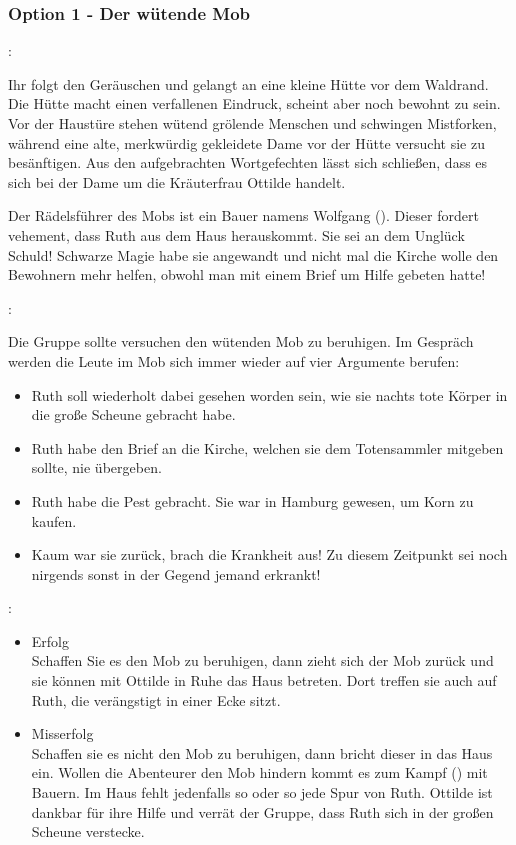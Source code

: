 \subsubsection{Option 1 - Der wütende Mob}
\label{mob}

:

Ihr folgt den Geräuschen und gelangt an eine kleine Hütte vor dem Waldrand. Die Hütte macht einen verfallenen Eindruck, scheint aber noch bewohnt zu sein. Vor der Haustüre stehen wütend grölende Menschen und schwingen Mistforken, während eine alte, merkwürdig gekleidete Dame vor der Hütte versucht sie zu besänftigen.
Aus den aufgebrachten Wortgefechten lässt sich schließen, dass es sich bei der Dame um die Kräuterfrau Ottilde handelt.

Der Rädelsführer des Mobs ist ein Bauer namens Wolfgang (\blue{\ref{Wolfgang}}). Dieser fordert vehement, dass Ruth aus dem Haus herauskommt. Sie sei an dem Unglück Schuld! Schwarze Magie habe sie angewandt und nicht mal die Kirche wolle den Bewohnern mehr helfen, obwohl man mit einem Brief um Hilfe gebeten hatte!

:

Die Gruppe sollte versuchen den wütenden Mob zu beruhigen. Im Gespräch werden die Leute im Mob sich immer wieder auf vier Argumente berufen:

\begin{itemize}
  \item Ruth soll wiederholt dabei gesehen worden sein, wie sie nachts tote Körper in die große Scheune gebracht habe.
  \item Ruth habe den Brief an die Kirche, welchen sie dem Totensammler mitgeben sollte, nie übergeben.
  \item Ruth habe die Pest gebracht. Sie war in Hamburg gewesen, um Korn zu kaufen.
  \item Kaum war sie zurück, brach die Krankheit aus! Zu diesem Zeitpunkt sei noch nirgends sonst in der Gegend jemand erkrankt!
\end{itemize}

:

\begin{itemize}
  \item Erfolg \\
  Schaffen Sie es den Mob zu beruhigen, dann zieht sich der Mob zurück und sie können mit Ottilde in Ruhe das Haus betreten. Dort treffen sie auch auf Ruth, die verängstigt in einer Ecke sitzt.
  \item Misserfolg \\
  Schaffen sie es nicht den Mob zu beruhigen, dann bricht dieser in das Haus ein. Wollen die Abenteurer den Mob hindern kommt es zum Kampf (\blue{\ref{kampf}}) mit Bauern. Im Haus fehlt jedenfalls so oder so jede Spur von Ruth. Ottilde ist dankbar für ihre Hilfe und verrät der Gruppe, dass Ruth sich in der großen Scheune verstecke.
\end{itemize}

